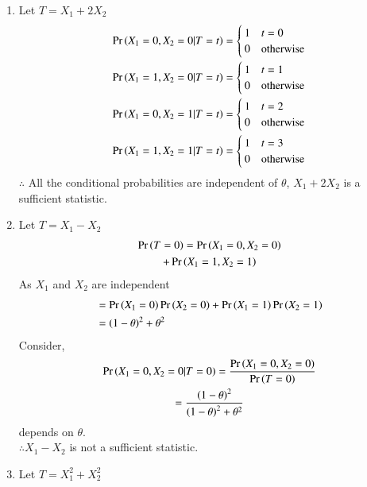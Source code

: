 \documentclass[journal,12pt,twocolumn]{IEEEtran}
\begin{document}
\begin{enumerate}
    \item Let $T=X_1+2X_2$
    \begin{align}
        \Pr\left(X_1=0,X_2=0 | T=t\right) = 
        \begin{cases}
            1 & t=0\\
            0 & \text{otherwise}
        \end{cases}\\
        \Pr\left(X_1=1,X_2=0 | T=t\right) = 
        \begin{cases}
            1 & t=1\\
            0 & \text{otherwise}
        \end{cases}\\
        \Pr\left(X_1=0,X_2=1 | T=t\right) = 
        \begin{cases}
            1 & t=2\\
            0 & \text{otherwise}
        \end{cases}\\
        \Pr\left(X_1=1,X_2=1 | T=t\right) = 
        \begin{cases}
            1 & t=3\\
            0 & \text{otherwise}
        \end{cases}
    \end{align}
    $\therefore$ All the conditional probabilities are independent of $\theta$, $X_1+2X_2$ is a sufficient statistic.
    \item Let $T=X_1-X_2$
    \begin{multline}
        \Pr\left(T=0\right)=\Pr\left(X_1=0,X_2=0\right)\\+\Pr\left(X_1=1,X_2=1\right)
    \end{multline}
    As $X_1$ and $X_2$ are independent
    \begin{align}
        &=\Pr\left(X_1=0\right)\Pr\left(X_2=0\right)+\Pr\left(X_1=1\right)\Pr\left(X_2=1\right)\\
        &=\left(1-\theta\right)^2 + \theta^2
    \end{align}
    Consider,
    \begin{multline}
        \Pr\left(X_1=0,X_2=0 | T=0\right) = \frac{\Pr\left(X_1=0,X_2=0\right)}{\Pr\left(T=0\right)}\\
        =\frac{\left(1-\theta\right)^2}{\left(1-\theta\right)^2 + \theta^2}
    \end{multline}
    depends on $\theta$. \\
    $\therefore X_1-X_2$ is not a sufficient statistic.
    \item Let $T=X_1^2+X_2^2$
    \begin{align}

\end{align}
\end{enumerate}
\end{document}

